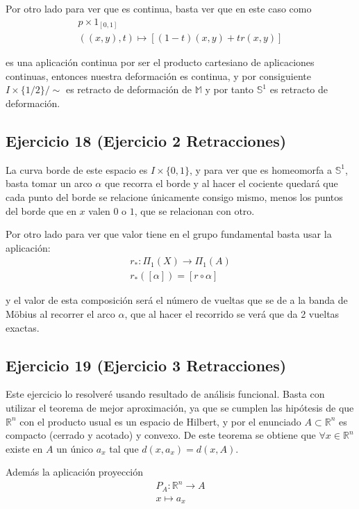 \documentclass{article}
\begin{document}
Por otro lado para ver que es continua, basta ver que en este caso como
\begin{gather*}
p\times 1_{[0,1]}\\
((x,y),t)\mapsto [(1-t)(x,y)+tr(x,y)]
\end{gather*}

es una aplicación continua por ser el producto cartesiano de aplicaciones continuas, entonces nuestra deformación es continua, y por consiguiente $I\times\{1/2\}/\sim$ es retracto de deformación de $\mathbb{M}$ y por tanto $\mathbb{S}^1$ es retracto de deformación.

\subsection{Ejercicio 18 (Ejercicio 2 Retracciones)}
La curva borde de este espacio es $I\times \{0,1\}$, y para ver que es homeomorfa a $\mathbb{S}^1$, basta tomar un arco $\alpha$ que recorra el borde y al hacer el cociente quedará que cada punto del borde se relacione únicamente consigo mismo, menos los puntos del borde que en $x$ valen $0$ o $1$, que se relacionan con otro.

Por otro lado para ver que valor tiene en el grupo fundamental basta usar la aplicación:
\begin{gather*}
r_*:\Pi_1(X)\rightarrow \Pi_1(A)\\
r_*([\alpha])=[r\circ \alpha]
\end{gather*}

y el valor de esta composición será el número de vueltas que se de a la banda de Möbius al recorrer el arco $\alpha$, que al hacer el recorrido se verá que da 2 vueltas exactas.

\subsection{Ejercicio 19 (Ejercicio 3 Retracciones)}
Este ejercicio lo resolveré usando resultado de análisis funcional. Basta con utilizar el teorema de mejor aproximación, ya que se cumplen las hipótesis de que $\mathbb{R}^n$ con el producto usual es un espacio de Hilbert, y por el enunciado $A\subset \mathbb{R}^n$ es compacto (cerrado y acotado) y convexo. De este teorema se obtiene que $\forall x\in \mathbb{R}^n$ existe en $A$ un único $a_x$ tal que $d(x,a_x)=d(x,A)$. 

Además la aplicación proyección 
\begin{gather*}
P_A:\mathbb{R}^n\rightarrow A\\
x\mapsto a_x
\end{gather*}
\end{document}
